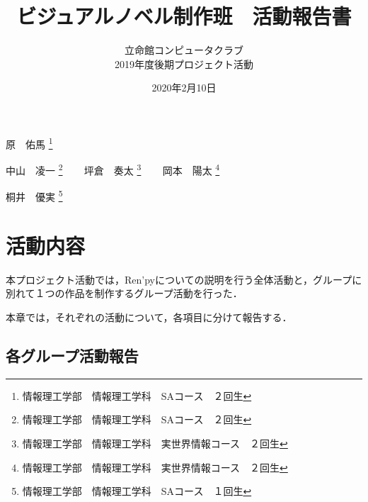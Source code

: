 \documentclass[a4paper]{jarticle}
\title{ビジュアルノベル制作班　活動報告書}
\author{立命館コンピュータクラブ\\2019年度後期プロジェクト活動}
\date{2020年2月10日}
\begin{document}
  \maketitle

  \begin{center}
    原　佑馬 \footnote{情報理工学部　情報理工学科　SAコース　２回生}

    中山　凌一 \footnote{情報理工学部　情報理工学科　SAコース　２回生}
    ~~~
    坪倉　奏太 \footnote{情報理工学部　情報理工学科　実世界情報コース　２回生}
    ~~~
    岡本　陽太 \footnote{情報理工学部　情報理工学科　実世界情報コース　２回生}

    桐井　優実 \footnote{情報理工学部　情報理工学科　SAコース　１回生}
  \end{center}

  \newpage
  \tableofcontents
  \newpage

  
  
  \section{活動内容}

    本プロジェクト活動では，Ren'pyについての説明を行う全体活動と，グループに別れて１つの作品を制作するグループ活動を行った．
      
    本章では，それぞれの活動について，各項目に分けて報告する．

    

    

    

    

    \subsection{各グループ活動報告}

      

      

      

    

    

    
\end{document}
